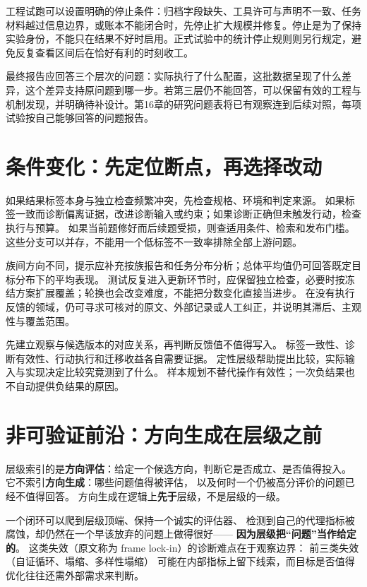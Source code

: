 工程试跑可以设置明确的停止条件：归档字段缺失、工具许可与声明不一致、任务材料越过信息边界，或账本不能闭合时，先停止扩大规模并修复。停止是为了保持实验身份，不能只在结果不好时启用。正式试验中的统计停止规则则另行规定，避免反复查看区间后在恰好有利的时刻收工。

最终报告应回答三个层次的问题：实际执行了什么配置，这批数据呈现了什么差异，这个差异支持原问题到哪一步。若第三层仍不能回答，可以保留有效的工程与机制发现，并明确待补设计。第16章的研究问题表将已有观察连到后续对照，每项试验按自己能够回答的问题报告。


\section{条件变化：先定位断点，再选择改动}
\label{sec:ch04-conditions}

如果结果标签本身与独立检查频繁冲突，先检查规格、环境和判定来源。
如果标签一致而诊断偏离证据，改进诊断输入或约束；如果诊断正确但未触发行动，检查执行与预算。
如果当前题修好而后续题受损，则查适用条件、检索和发布门槛。
这些分支可以并存，不能用一个低标签不一致率排除全部上游问题。

族间方向不同，提示应补充按族报告和任务分布分析；总体平均值仍可回答既定目标分布下的平均表现。
测试反复进入更新环节时，应保留独立检查，必要时按冻结方案扩展覆盖；轮换也会改变难度，不能把分数变化直接当进步。
在没有执行反馈的领域，仍可寻求可核对的原文、外部记录或人工纠正，并说明其滞后、主观性与覆盖范围。

\begin{principlebox}
先建立观察与候选版本的对应关系，再判断反馈值不值得写入。
标签一致性、诊断有效性、行动执行和迁移收益各自需要证据。
定性层级帮助提出比较，实际输入与实现决定比较究竟测到了什么。
样本规划不替代操作有效性；一次负结果也不自动提供负结果的原因。
\end{principlebox}

\section{非可验证前沿：方向生成在层级之前}
\label{sec:ch04-framing}

层级索引的是\textbf{方向评估}：给定一个候选方向，判断它是否成立、是否值得投入。
它不索引\textbf{方向生成}：哪些问题值得被评估，
以及何时一个仍被高分评价的问题已经不值得回答\cite{rsi-survey-2607}。
方向生成在逻辑上\textbf{先于}层级，不是层级的一级。

一个闭环可以爬到层级顶端、保持一个诚实的评估器、
检测到自己的代理指标被腐蚀，却仍然在一个早该放弃的问题上做得很好——
\textbf{因为层级把“问题”当作给定的}。
这类失效（原文称为 frame lock-in）的诊断难点在于观察边界：
前三类失效（自证循环、塌缩、多样性塌缩）
可能在内部指标上留下线索，而目标是否值得优化往往还需外部需求来判断\cite{rsi-survey-2607}。

